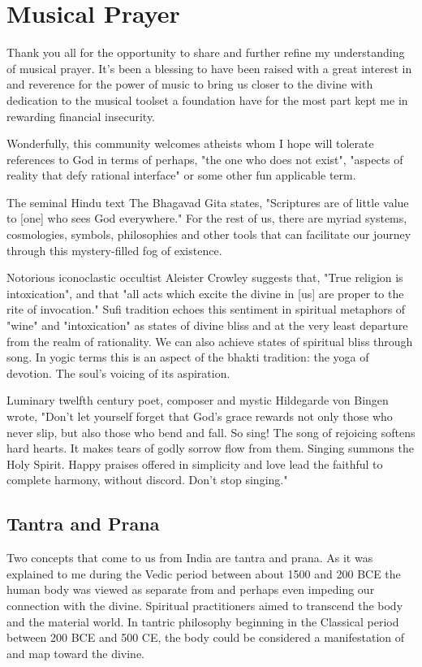 \documentclass[12pt]{article}
\begin{document}
\section*{Musical Prayer}

Thank you all for  the opportunity to share and further refine my understanding of musical prayer. It's been a blessing to have been raised with a great interest in and reverence for the power of music to bring us closer to the divine with dedication to the musical toolset a foundation have for the most part kept me in rewarding financial insecurity.

Wonderfully, this community welcomes atheists whom I hope will tolerate references to God in terms of perhaps, "the one who does not exist", "aspects of reality that defy rational interface" or some other fun applicable term.

The seminal Hindu text The Bhagavad Gita states, "Scriptures are of little value to [one] who sees God everywhere." For the rest of us, there are myriad systems, cosmologies, symbols, philosophies and other tools that can facilitate our journey through this mystery-filled fog of existence.

Notorious iconoclastic occultist Aleister Crowley suggests that, "True religion is intoxication", and that "all acts which excite the divine in [us] are proper to the rite of invocation." Sufi tradition echoes this sentiment in spiritual metaphors of "wine" and "intoxication" as states of divine bliss and at the very least departure from the realm of rationality. We can also achieve states of spiritual bliss through song. In yogic terms this is an aspect of the bhakti tradition: the yoga of devotion. The soul's voicing of its aspiration.

Luminary twelfth century poet, composer and mystic Hildegarde von Bingen wrote, "Don't let yourself forget that God's grace rewards not only those who never slip, but also those who bend and fall. So sing! The song of rejoicing softens hard hearts. It makes tears of godly sorrow flow from them. Singing summons the Holy Spirit. Happy praises offered in simplicity and love lead the faithful to complete harmony, without discord. Don't stop singing."

\subsection*{Tantra and Prana}

Two concepts that come to us from India are tantra and prana. As it was explained to me during the Vedic period between about 1500 and 200 BCE the human body was viewed as separate from and perhaps even impeding our connection with the divine. Spiritual practitioners aimed to transcend the body and the material world. In tantric philosophy beginning in the Classical period between 200 BCE and 500 CE, the body could be considered a manifestation of and map toward the divine.
\end{document}
